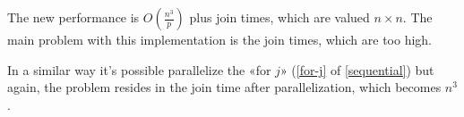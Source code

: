 The new performance is \(\displaystyle O\left(\frac{n^3}{p}\right)\) plus join times, which are valued \(n\times n\).
The main problem with this implementation is the join times, which are too high.

In a similar way it's possible parallelize the «for \(j\)» (\cref{for-j} of \cref{sequential}) but again, the problem resides in the join time after parallelization, which becomes \(n^3\).

\FloatBarrier
